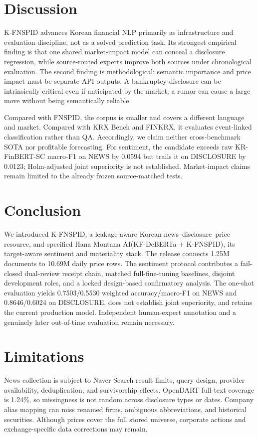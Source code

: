 \documentclass[11pt]{article}
\newcommand{\dataset}{K-FNSPID}
\newcommand{\system}{Hana Montana AI(KF-DeBERTa + K-FNSPID)}
\begin{document}
\section{Discussion}

\dataset{} advances Korean financial NLP primarily as infrastructure and evaluation discipline, not as a solved prediction task. Its strongest empirical finding is that one shared market-impact model can conceal a disclosure regression, while source-routed experts improve both sources under chronological evaluation. The second finding is methodological: semantic importance and price impact must be separate API outputs. A bankruptcy disclosure can be intrinsically critical even if anticipated by the market; a rumor can cause a large move without being semantically reliable.

Compared with FNSPID, the corpus is smaller and covers a different language and market. Compared with KRX Bench and FINKRX, it evaluates event-linked classification rather than QA. Accordingly, we claim neither cross-benchmark SOTA nor profitable forecasting. For sentiment, the candidate exceeds raw KR-FinBERT-SC macro-F1 on NEWS by 0.0594 but trails it on DISCLOSURE by 0.0123; Holm-adjusted joint superiority is not established. Market-impact claims remain limited to the already frozen source-matched tests.

\section{Conclusion}

We introduced \dataset, a leakage-aware Korean news--disclosure--price resource, and specified \system{}, its target-aware sentiment and materiality stack. The release connects 1.25M documents to 10.69M daily price rows. The sentiment protocol contributes a fail-closed dual-review receipt chain, matched full-fine-tuning baselines, disjoint development roles, and a locked design-based confirmatory analysis. The one-shot evaluation yields 0.7503/0.5530 weighted accuracy/macro-F1 on NEWS and 0.8646/0.6024 on DISCLOSURE, does not establish joint superiority, and retains the current production model. Independent human-expert annotation and a genuinely later out-of-time evaluation remain necessary.

\section*{Limitations}

News collection is subject to Naver Search result limits, query design, provider availability, deduplication, and survivorship effects. OpenDART full-text coverage is 1.24\%, so missingness is not random across disclosure types or dates. Company alias mapping can miss renamed firms, ambiguous abbreviations, and historical securities. Although prices cover the full stored universe, corporate actions and exchange-specific data corrections may remain.
\end{document}
